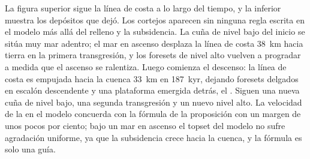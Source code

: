 La figura superior sigue la línea de costa a lo largo del tiempo, y la inferior
muestra los depósitos que dejó. Los cortejos aparecen sin ninguna regla escrita en el
modelo más allá del relleno y la subsidencia. La cuña de nivel bajo del inicio se sitúa muy
mar adentro; el mar en ascenso desplaza la línea de costa \qty{38}{km} hacia tierra en la primera
transgresión, y los foresets de nivel alto vuelven a progradar a medida que el ascenso se ralentiza.
Luego comienza el descenso: la línea de costa es empujada hacia la cuenca \qty{33}{km} en
\qty{187}{kyr}, dejando foresets delgados en escalón descendente y una plataforma emergida
detrás, el . Siguen una nueva cuña de nivel bajo, una segunda transgresión
y un nuevo nivel alto. La velocidad de la  en el modelo
concuerda con la fórmula de la proposición con un margen de unos pocos por ciento; bajo un
mar en ascenso el topset del modelo no sufre agradación uniforme, ya que la subsidencia
crece hacia la cuenca, y la fórmula es solo una guía.


